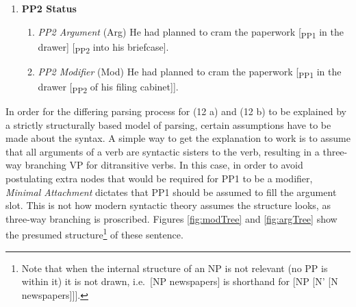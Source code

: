 \documentclass[12pt,oneside]{book}
\providecommand{\tightlist}{%
  \setlength{\itemsep}{0pt}\setlength{\parskip}{0pt}}
\let\rmarkdownfootnote\footnote%
\def\footnote{\protect\rmarkdownfootnote}
\begin{document}

\begin{enumerate}
\def\labelenumi{(\arabic{enumi})}
\setcounter{enumi}{11}
\tightlist
\item
  \textbf{PP2 Status}

  \begin{enumerate}
  \def\labelenumii{(\alph{enumii})}
  \tightlist
  \item
    \emph{PP2 Argument} (Arg) \linebreak
    He had planned to cram the paperwork {[}\textsubscript{PP1} in the drawer{]} {[}\textsubscript{PP2} into his briefcase{]}.
  \item
    \emph{PP2 Modifier} (Mod) \linebreak
    He had planned to cram the paperwork {[}\textsubscript{PP1} in the drawer {[}\textsubscript{PP2} of his filing cabinet{]}{]}.
  \end{enumerate}
\end{enumerate}

In order for the differing parsing process for (12 a) and (12 b) to be explained by a strictly structurally based model of parsing, certain assumptions  have to be made about the syntax. A simple way to get the explanation to work is to assume that all arguments of a verb are syntactic sisters to the verb, resulting in a three-way branching VP for ditransitive verbs. In this case, in order to avoid postulating extra nodes that would be required for PP1 to be a modifier, \emph{Minimal Attachment} dictates that PP1 should be assumed to fill the argument slot. This is not how modern syntactic theory assumes the structure looks, as three-way branching is proscribed. Figures \ref{fig:modTree} and \ref{fig:argTree} show the presumed  structure\footnote{Note that when the internal structure of an NP is not relevant (no PP is within it) it is not drawn, i.e.~{[}NP newspapers{]} is shorthand for {[}NP {[}N' {[}N newspapers{]}{]}{]}.} of these sentence.
\end{document}
